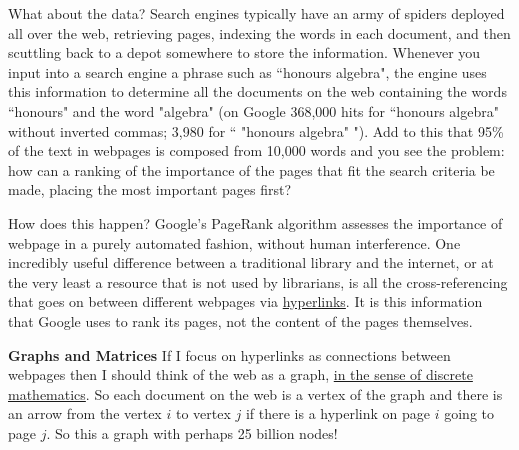 \documentclass[11pt]{amsbook}
\theoremstyle{definition}
\begin{document}
What about the data? Search engines typically have an army of spiders deployed all over the web, retrieving pages, indexing the words in each document, and then scuttling back to a depot somewhere to store the information. Whenever you input into a search engine a phrase such as ``honours algebra", the engine uses this information to determine all the documents on the web containing the words ``honours" and the word "algebra"  (on Google 368,000 hits for ``honours algebra" without inverted commas; 3,980 for `` "honours algebra" "). Add to this that 95\% of the text in webpages is composed from 10,000 words and you see the problem: how can a ranking of the importance of the pages that fit the search criteria be made, placing the most important pages first?

How does this happen? Google's PageRank algorithm assesses the importance of webpage in a purely automated fashion, without human interference. One incredibly useful difference between a traditional library and the internet, or at the very least a resource that is not used by librarians, is all the cross-referencing that goes on between different webpages via \href{http://en.wikipedia.org/wiki/Hyperlink}{hyperlinks}. It is this information that Google uses to rank its pages, not the content of the pages themselves.
\medskip

\noindent
{\bf Graphs and Matrices} If I focus on hyperlinks as connections between webpages then I should think of the web as a graph, \href{http://en.wikipedia.org/wiki/Discrete_mathematics#Graph_theory}{in the sense of discrete mathematics}. So each document on the web is a vertex of the graph and there is an arrow from the vertex $i$ to vertex $j$ if there is a hyperlink on page $i$ going to page $j$. So this a graph with perhaps 25 billion nodes!
\end{document}
